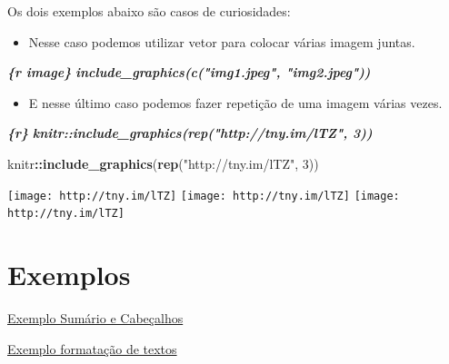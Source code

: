 \documentclass[
]{book}
\newenvironment{Shaded}{\begin{snugshade}}{\end{snugshade}}
\newcommand{\DecValTok}[1]{\textcolor[rgb]{0.00,0.00,0.81}{#1}}
\newcommand{\InformationTok}[1]{\textcolor[rgb]{0.56,0.35,0.01}{\textbf{\textit{#1}}}}
\newcommand{\KeywordTok}[1]{\textcolor[rgb]{0.13,0.29,0.53}{\textbf{#1}}}
\newcommand{\NormalTok}[1]{#1}
\newcommand{\OperatorTok}[1]{\textcolor[rgb]{0.81,0.36,0.00}{\textbf{#1}}}
\newcommand{\StringTok}[1]{\textcolor[rgb]{0.31,0.60,0.02}{#1}}
\providecommand{\tightlist}{%
  \setlength{\itemsep}{0pt}\setlength{\parskip}{0pt}}
\begin{document}
Os dois exemplos abaixo são casos de curiosidades:

\begin{itemize}
\tightlist
\item
  Nesse caso podemos utilizar vetor para colocar várias imagem juntas.
\end{itemize}

\begin{Shaded}
\begin{Highlighting}[]
\InformationTok{\textasciigrave{}\textasciigrave{}\textasciigrave{}\{r image\}}
\InformationTok{include\_graphics(c("img1.jpeg", "img2.jpeg"))}
\InformationTok{\textasciigrave{}\textasciigrave{}\textasciigrave{}}
\end{Highlighting}
\end{Shaded}

\begin{itemize}
\tightlist
\item
  E nesse último caso podemos fazer repetição de uma imagem várias vezes.
\end{itemize}

\begin{Shaded}
\begin{Highlighting}[]
\InformationTok{\textasciigrave{}\textasciigrave{}\textasciigrave{}\{r\}}
\InformationTok{knitr::include\_graphics(rep("http://tny.im/lTZ", 3))}
\InformationTok{\textasciigrave{}\textasciigrave{}\textasciigrave{}}
\end{Highlighting}
\end{Shaded}

\begin{Shaded}
\begin{Highlighting}[]
\NormalTok{knitr}\OperatorTok{::}\KeywordTok{include\_graphics}\NormalTok{(}\KeywordTok{rep}\NormalTok{(}\StringTok{"http://tny.im/lTZ"}\NormalTok{, }\DecValTok{3}\NormalTok{))}
\end{Highlighting}
\end{Shaded}

\texttt{[image: http://tny.im/lTZ]} \texttt{[image: http://tny.im/lTZ]} \texttt{[image: http://tny.im/lTZ]}

\hypertarget{exemplos}{%
\section{Exemplos}\label{exemplos}}

\href{exemplos/102-sumario_e_cabecalho.html}{Exemplo Sumário e Cabeçalhos}

\href{exemplos/103-formatacao_de_texto.html}{Exemplo formatação de textos}
\end{document}
